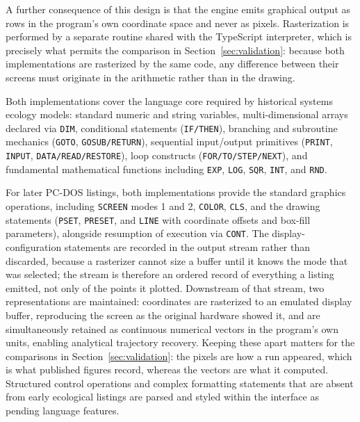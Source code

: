 \documentclass[11pt,a4paper]{article}
\begin{document}
A further consequence of this design is that the engine emits graphical output as rows in the program's own coordinate space and never as pixels. Rasterization is performed by a separate routine shared with the TypeScript interpreter, which is precisely what permits the comparison in Section~\ref{sec:validation}: because both implementations are rasterized by the same code, any difference between their screens must originate in the arithmetic rather than in the drawing.

Both implementations cover the language core required by historical systems ecology models: standard numeric and string variables, multi-dimensional arrays declared via \texttt{DIM}, conditional statements (\texttt{IF/THEN}), branching and subroutine mechanics (\texttt{GOTO}, \texttt{GOSUB/RETURN}), sequential input/output primitives (\texttt{PRINT}, \texttt{INPUT}, \texttt{DATA/READ/RESTORE}), loop constructs (\texttt{FOR/TO/STEP/NEXT}), and fundamental mathematical functions including \texttt{EXP}, \texttt{LOG}, \texttt{SQR}, \texttt{INT}, and \texttt{RND}.

For later PC-DOS listings, both implementations provide the standard graphics operations, including \texttt{SCREEN} modes 1 and 2, \texttt{COLOR}, \texttt{CLS}, and the drawing statements (\texttt{PSET}, \texttt{PRESET}, and \texttt{LINE} with coordinate offsets and box-fill parameters), alongside resumption of execution via \texttt{CONT}. The display-configuration statements are recorded in the output stream rather than discarded, because a rasterizer cannot size a buffer until it knows the mode that was selected; the stream is therefore an ordered record of everything a listing emitted, not only of the points it plotted. Downstream of that stream, two representations are maintained: coordinates are rasterized to an emulated display buffer, reproducing the screen as the original hardware showed it, and are simultaneously retained as continuous numerical vectors in the program's own units, enabling analytical trajectory recovery. Keeping these apart matters for the comparisons in Section~\ref{sec:validation}: the pixels are how a run appeared, which is what published figures record, whereas the vectors are what it computed. Structured control operations and complex formatting statements that are absent from early ecological listings are parsed and styled within the interface as pending language features.
\end{document}
